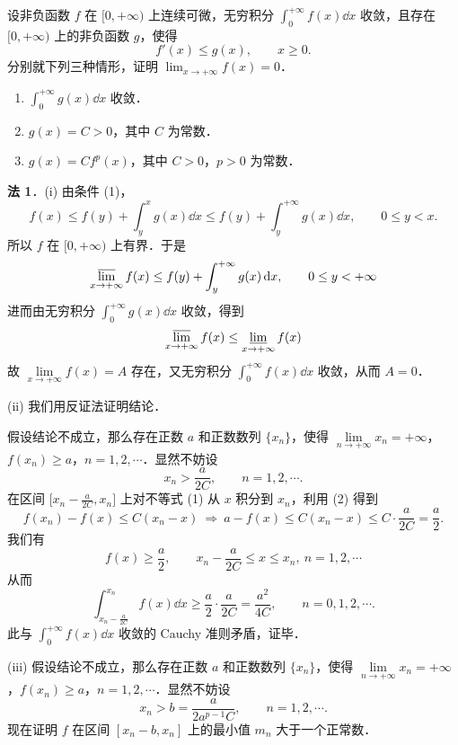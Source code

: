 设非负函数 $f$ 在 $[0,+\infty)$ 上连续可微，无穷积分 $\displaystyle\int_{0}^{+\infty}f(x)\dd x$ 收敛，且存在 $[0,+\infty)$ 上的非负函数 $g$，使得
\[
f'(x)\le g(x),\qquad x\ge 0. \tag{1}
\]
分别就下列三种情形，证明 $\displaystyle\lim_{x\to+\infty}f(x)=0$．
\begin{enumerate}[label=(\roman*)]
  \item $\displaystyle\int_{0}^{+\infty}g(x)\dd x$ 收敛．
  \item $g(x)=C>0$，其中 $C$ 为常数．
  \item $g(x)=Cf^{p}(x)$，其中 $C>0$，$p>0$ 为常数．
\end{enumerate}
\begin{solution}
\textbf{法 1}．(i) 由条件 (1)，
\[
f(x)\le f(y)+\int_{y}^{x}g(x)\dd x\le f(y)+\int_{y}^{+\infty}g(x)\dd x,\qquad 0\le y<x.
\]
所以 $f$ 在 $[0,+\infty)$ 上有界．于是
\[
\varlimsup_{x\to+\infty}f(x)\le f(y)+\int_{y}^{+\infty}g(x)\,\mathrm{d} x,\qquad 0\le y<+\infty
\]
进而由无穷积分 $\int_{0}^{+\infty}g(x)\dd x$ 收敛，得到
\[
\varlimsup_{x\to+\infty}f(x)\le\varliminf_{x\to+\infty}f(x)
\]
故 $\lim\limits_{x\to+\infty}f(x)=A$ 存在，又无穷积分 $\int_{0}^{+\infty}f(x)\dd x$ 收敛，从而 $A=0$．

(ii) 我们用反证法证明结论．

假设结论不成立，那么存在正数 $a$ 和正数数列 $\{x_{n}\}$，使得 $\lim\limits_{n\to+\infty}x_{n}=+\infty$，$f(x_{n})\ge a$，$n=1,2,\cdots$．显然不妨设
\begin{equation*}
x_{n}>\frac{a}{2C},\qquad n=1,2,\cdots. \tag{2}
\end{equation*}
在区间 $\bigl[x_{n}-\frac{a}{2C},x_{n}\bigr]$ 上对不等式 (1) 从 $x$ 积分到 $x_{n}$，利用 (2) 得到
\[
f(x_{n})-f(x)\le C(x_{n}-x)\ \Rightarrow\ a-f(x)\le C(x_{n}-x)\le C\cdot\frac{a}{2C}=\frac{a}{2}.
\]
我们有
\[
f(x)\ge\frac{a}{2},\qquad x_{n}-\frac{a}{2C}\le x\le x_{n},\ n=1,2,\cdots
\]
从而
\[
\int_{x_{n}-\frac{a}{2C}}^{x_{n}}f(x)\dd x\ge\frac{a}{2}\cdot\frac{a}{2C}=\frac{a^{2}}{4C},\qquad n=0,1,2,\cdots.
\]
此与 $\int_{0}^{+\infty}f(x)\dd x$ 收敛的 Cauchy 准则矛盾，证毕．

(iii) 假设结论不成立，那么存在正数 $a$ 和正数数列 $\{x_{n}\}$，使得 $\lim\limits_{n\to+\infty}x_{n}=+\infty$，$f(x_{n})\ge a$，$n=1,2,\cdots$．显然不妨设
\begin{equation*}
x_{n}>b=\frac{a}{2a^{p-1}C},\qquad n=1,2,\cdots. \tag{3}
\end{equation*}
现在证明 $f$ 在区间 $[x_{n}-b,x_{n}]$ 上的最小值 $m_{n}$ 大于一个正常数．


\end{solution}
